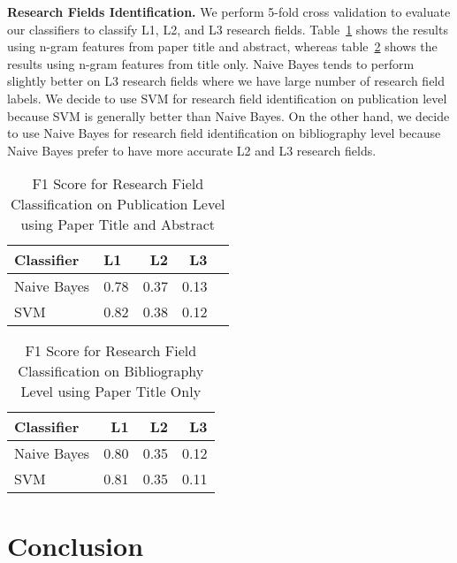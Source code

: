 \textbf{Research Fields Identification.} We perform 5-fold cross validation to evaluate our classifiers to classify L1, L2, and L3 research fields. Table~\ref{tab:rfields_pub_5cv} shows the results using n-gram features from paper title and abstract, whereas table~\ref{tab:rfields_rt_5cv} shows the results using n-gram features from title only. Naive Bayes tends to perform slightly better on L3 research fields where we have large number of research field labels. We decide to use SVM for research field identification on publication level because SVM is generally better than Naive Bayes. On the other hand, we decide to use Naive Bayes for research field identification on bibliography level because Naive Bayes prefer to have more accurate L2 and L3 research fields.

\begin{table}[t!]
\begin{center}
\begin{tabular}{|l|l|r|r|r|}
\hline \bf Classifier & \bf L1 & \bf L2 & \bf L3 \\ \hline
Naive Bayes & 0.78 & 0.37 & 0.13 \\
SVM & 0.82 & 0.38 & 0.12 \\
\hline
\end{tabular}
\end{center}
\caption{\label{tab:rfields_pub_5cv} F1 Score for Research Field Classification on Publication Level using Paper Title and Abstract}
\end{table}

\begin{table}[t!]
\begin{center}
\begin{tabular}{|l|r|r|r|}
\hline \bf Classifier  & \bf L1 & \bf L2 & \bf L3 \\ \hline
Naive Bayes & 0.80 & 0.35 & 0.12 \\
SVM & 0.81 & 0.35 & 0.11 \\
\hline
\end{tabular}
\end{center}
\caption{\label{tab:rfields_rt_5cv} F1 Score for Research Field Classification on Bibliography Level using Paper Title Only}
\end{table}


\section{Conclusion}
\label{sec:conclusion}


